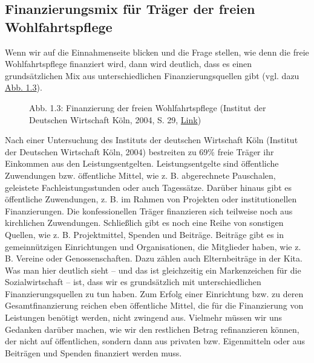\documentclass[
  letterpaper,
]{book}
\makeatletter
\newcommand*\pandocbounded[1]{%
  \sbox\pandoc@box{#1}%
  \Gscale@div\@tempa{\textheight}{\dimexpr\ht\pandoc@box+\dp\pandoc@box\relax}%
  \Gscale@div\@tempb{\linewidth}{\wd\pandoc@box}%
  \ifdim\@tempb\p@<\@tempa\p@\let\@tempa\@tempb\fi%
  \ifdim\@tempa\p@<\p@\scalebox{\@tempa}{\usebox\pandoc@box}%
  \else\usebox{\pandoc@box}%
  \fi%
}
\makeatother
\begin{document}
\subsection{Finanzierungsmix für Träger der freien
Wohlfahrtspflege}\label{finanzierungsmix}

Wenn wir auf die Einnahmenseite blicken und die Frage stellen, wie denn
die freie Wohlfahrtspflege finanziert wird, dann wird deutlich, dass es
einen grundsätzlichen Mix aus unterschiedlichen Finanzierungsquellen
gibt (vgl. dazu \hyperref[figure13]{Abb. 1.3}).

\begin{figure}

\pandocbounded{\texttt{[image: images/figure13.png]}} \hfill{}

\caption{Abb. 1.3: Finanzierung der freien Wohlfahrtspflege (Institut
der Deutschen Wirtschaft Köln, 2004, S. 29,
\href{https://www.yumpu.com/de/document/view/7199735/auf-den-schultern-der-schwachen}{Link})}

\end{figure}%

Nach einer Untersuchung des Instituts der deutschen Wirtschaft Köln
(Institut der Deutschen Wirtschaft Köln, 2004) bestreiten zu 69\% freie
Träger ihr Einkommen aus den Leistungsentgelten. Leistungsentgelte sind
öffentliche Zuwendungen bzw. öffentliche Mittel, wie z. B. abgerechnete
Pauschalen, geleistete Fachleistungsstunden oder auch Tagessätze.
Darüber hinaus gibt es öffentliche Zuwendungen, z. B. im Rahmen von
Projekten oder institutionellen Finanzierungen. Die konfessionellen
Träger finanzieren sich teilweise noch aus kirchlichen Zuwendungen.
Schließlich gibt es noch eine Reihe von sonstigen Quellen, wie z. B.
Projektmittel, Spenden und Beiträge. Beiträge gibt es in gemeinnützigen
Einrichtungen und Organisationen, die Mitglieder haben, wie z. B.
Vereine oder Genossenschaften. Dazu zählen auch Elternbeiträge in der
Kita. Was man hier deutlich sieht -- und das ist gleichzeitig ein
Markenzeichen für die Sozialwirtschaft -- ist, dass wir es grundsätzlich
mit unterschiedlichen Finanzierungsquellen zu tun haben. Zum Erfolg
einer Einrichtung bzw. zu deren Gesamtfinanzierung reichen eben
öffentliche Mittel, die für die Finanzierung von Leistungen benötigt
werden, nicht zwingend aus. Vielmehr müssen wir uns Gedanken darüber
machen, wie wir den restlichen Betrag refinanzieren können, der nicht
auf öffentlichen, sondern dann aus privaten bzw. Eigenmitteln oder aus
Beiträgen und Spenden finanziert werden muss.
\end{document}
